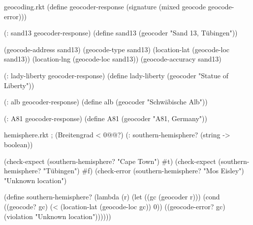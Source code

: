 \begin{filecontents*}{geocoding.rkt}
(define geocoder-response
  (signature (mixed geocode geocode-error)))

(: sand13 geocoder-response)
(define sand13
  (geocoder "Sand 13, Tübingen"))

(geocode-address sand13)
(geocode-type sand13)
(location-lat (geocode-loc sand13))
(location-lng (geocode-loc sand13))
(geocode-accuracy sand13)
  

(: lady-liberty geocoder-response)
(define lady-liberty
  (geocoder "Statue of Liberty"))

(: alb geocoder-response)
(define alb
  (geocoder "Schwäbische Alb"))

(: A81 geocoder-response)
(define A81
  (geocoder "A81, Germany"))
\end{filecontents*}
\begin{filecontents*}{hemisphere.rkt}
; (Breitengrad < 0@\latexcode{$^{\circ}$}@?)
(: southern-hemisphere? (string -> boolean))

(check-expect (southern-hemisphere? "Cape Town") #t)
(check-expect (southern-hemisphere? "Tübingen") #f)
(check-error  (southern-hemisphere? "Mos Eisley") "Unknown location")

(define southern-hemisphere?
  (lambda (r)
    (let ((gc (geocoder r)))
      (cond ((geocode? gc)  
             (< (location-lat (geocode-loc gc)) 0))
            ((geocode-error? gc) 
             (violation "Unknown location"))))))
\end{filecontents*}
